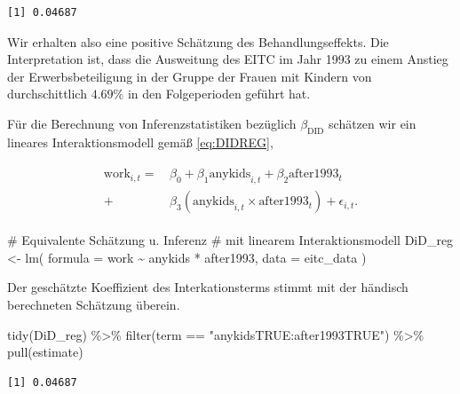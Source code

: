 \documentclass[
  a4paper,
  DIV=11,
  oneside]{scrreprt}
\newenvironment{Shaded}{\begin{snugshade}}{\end{snugshade}}
\newcommand{\AttributeTok}[1]{\textcolor[rgb]{0.40,0.45,0.13}{#1}}
\newcommand{\CommentTok}[1]{\textcolor[rgb]{0.37,0.37,0.37}{#1}}
\newcommand{\FunctionTok}[1]{\textcolor[rgb]{0.28,0.35,0.67}{#1}}
\newcommand{\NormalTok}[1]{\textcolor[rgb]{0.00,0.23,0.31}{#1}}
\newcommand{\OtherTok}[1]{\textcolor[rgb]{0.00,0.23,0.31}{#1}}
\newcommand{\SpecialCharTok}[1]{\textcolor[rgb]{0.37,0.37,0.37}{#1}}
\newcommand{\StringTok}[1]{\textcolor[rgb]{0.13,0.47,0.30}{#1}}
\begin{document}
\begin{verbatim}
[1] 0.04687
\end{verbatim}

Wir erhalten also eine positive Schätzung des Behandlungseffekts. Die
Interpretation ist, dass die Ausweitung des EITC im Jahr 1993 zu einem
Anstieg der Erwerbsbeteiligung in der Gruppe der Frauen mit Kindern von
durchschittlich \(4.69\%\) in den Folgeperioden geführt hat.

Für die Berechnung von Inferenzstatistiken bezüglich
\(\beta_\text{DID}\) schätzen wir ein lineares Interaktionsmodell gemäß
\eqref{eq:DIDREG},

\begin{align}
  \begin{split}
    \text{work}_{i,t} =&\, \beta_0 + \beta_1 \text{anykids}_{i,t} + \beta_2 \text{after1993}_t \\
  +&\, \beta_3 (\text{anykids}_{i,t} \times \text{after1993}_t) + \epsilon_{i,t}.
  \end{split}\label{eq:eitcmod}
\end{align}

\begin{Shaded}
\begin{Highlighting}[]
\CommentTok{\# Equivalente Schätzung u. Inferenz }
\CommentTok{\# mit linearem Interaktionsmodell}
\NormalTok{DiD\_reg }\OtherTok{\textless{}{-}} \FunctionTok{lm}\NormalTok{(}
  \AttributeTok{formula =}\NormalTok{ work }\SpecialCharTok{\textasciitilde{}}\NormalTok{ anykids }\SpecialCharTok{*}\NormalTok{ after1993, }
  \AttributeTok{data =}\NormalTok{ eitc\_data}
\NormalTok{)}
\end{Highlighting}
\end{Shaded}

Der geschätzte Koeffizient des Interkationsterms stimmt mit der händisch
berechneten Schätzung überein.

\begin{Shaded}
\begin{Highlighting}[]
\FunctionTok{tidy}\NormalTok{(DiD\_reg) }\SpecialCharTok{\%\textgreater{}\%} 
  \FunctionTok{filter}\NormalTok{(term }\SpecialCharTok{==} \StringTok{"anykidsTRUE:after1993TRUE"}\NormalTok{) }\SpecialCharTok{\%\textgreater{}\%} 
  \FunctionTok{pull}\NormalTok{(estimate)}
\end{Highlighting}
\end{Shaded}

\begin{verbatim}
[1] 0.04687
\end{verbatim}
\end{document}
